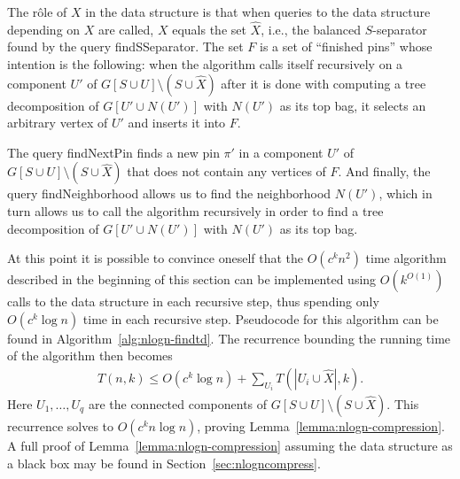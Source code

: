 \documentclass[a4paper,11pt]{article}
\theoremstyle{definition}
\theoremstyle{remark}
\newcommand{\qnei}{\textnormal{findNeighborhood}}
\newcommand{\qSsep}{\textnormal{findSSeparator}}
\newcommand{\qpin}{\textnormal{findNextPin}}
\newcommand{\pin}{\pi}
\begin{document}
The rôle of $X$ in the data structure is that when queries to the data
structure depending on $X$ are called, $X$ equals the set $\hat{X}$,
i.e., the balanced $S$-separator found by the query \qSsep{}.  The set
$F$ is a set of ``finished pins'' whose intention is the following:
when the algorithm calls itself recursively on a component $U'$ of
$G[S \cup U] \setminus (S \cup \hat{X})$ after it is done with
computing a tree decomposition of $G[U' \cup N(U')]$ with $N(U')$ as
its top bag, it selects an arbitrary vertex of $U'$ and inserts it
into $F$.  

The query \qpin{} finds a new pin $\pin{}'$ in a component $U'$ of $G[S
\cup U] \setminus (S \cup \hat{X})$ that does not contain any vertices
of $F$.  And finally, the query \qnei{} allows us to find the
neighborhood $N(U')$, which in turn allows us to call the algorithm
recursively in order to find a tree decomposition of $G[U' \cup N(U')]$
with $N(U')$ as its top bag.

At this point it is possible to convince oneself that the $O(c^kn^2)$
time algorithm described in the beginning of this section can be
implemented using $O(k^{O(1)})$ calls to the data structure in each
recursive step, thus spending only $O(c^k \log n)$ time in each
recursive step.  Pseudocode for this algorithm can be found in
Algorithm~\ref{alg:nlogn-findtd}.  The recurrence bounding the running
time of the algorithm then becomes
\begin{align*} T(n,k) \leq O(c^{k}\log n) + \sum_{U_i} T(|U_i \cup \hat{X}|,
  k).  \end{align*} Here $U_1, \ldots ,U_q$ are the connected
components of $G[S \cup U] \setminus (S \cup \hat{X})$.  This
recurrence solves to $O(c^k n\log n)$, proving
Lemma~\ref{lemma:nlogn-compression}.  A full proof of
Lemma~\ref{lemma:nlogn-compression} assuming the data structure as a
black box may be found in Section~\ref{sec:nlogncompress}.
\end{document}
